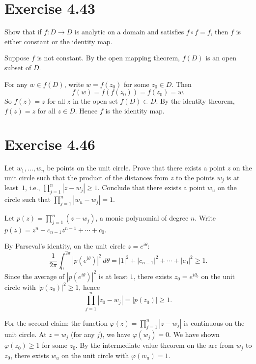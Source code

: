 \documentclass{article}
\begin{document}
\section{Exercise 4.43}

Show that if $f : D \to D$ is analytic on a domain and satisfies
$f \circ f = f$, then $f$ is either constant or the identity map.

\begin{solution}
  Suppose $f$ is not constant. By the open mapping theorem,
  $f(D)$ is an open subset of $D$.

  For any $w \in f(D)$, write $w = f(z_0)$ for some $z_0 \in D$.
  Then
  \[
    f(w) = f(f(z_0)) = f(z_0) = w.
  \]
  So $f(z) = z$ for all $z$ in the open set $f(D) \subset D$.
  By the identity theorem, $f(z) = z$ for all $z \in D$.
  Hence $f$ is the identity map.
\end{solution}

\section{Exercise 4.46}

Let $w_1, \ldots, w_n$ be points on the unit circle.
Prove that there exists a point $z$ on the unit circle such that
the product of the distances from $z$ to the points $w_j$ is at
least~$1$, i.e.,
$\prod_{j=1}^{n} |z - w_j| \ge 1$.
Conclude that there exists a point $w_u$ on the circle such that
$\prod_{j=1}^{n} |w_u - w_j| = 1$.

\begin{solution}
  Let $p(z) = \prod_{j=1}^{n}(z - w_j)$, a monic polynomial of
  degree $n$. Write $p(z) = z^n + c_{n-1}z^{n-1} + \cdots + c_0$.

  By Parseval's identity, on the unit circle $z = e^{i\theta}$:
  \[
    \frac{1}{2\pi}\int_0^{2\pi} |p(e^{i\theta})|^2 \, d\theta
    = |1|^2 + |c_{n-1}|^2 + \cdots + |c_0|^2
    \ge 1.
  \]
  Since the average of $|p(e^{i\theta})|^2$ is at least $1$, there
  exists $z_0 = e^{i\theta_0}$ on the unit circle with
  $|p(z_0)|^2 \ge 1$, hence
  \[
    \prod_{j=1}^{n} |z_0 - w_j| = |p(z_0)| \ge 1.
  \]

  For the second claim: the function
  $\varphi(z) = \prod_{j=1}^n |z - w_j|$ is continuous on the unit
  circle. At $z = w_j$ (for any $j$), we have $\varphi(w_j) = 0$.
  We have shown $\varphi(z_0) \ge 1$ for some $z_0$.
  By the intermediate value theorem on the arc from $w_j$ to $z_0$,
  there exists $w_u$ on the unit circle with $\varphi(w_u) = 1$.
\end{solution}
\end{document}
